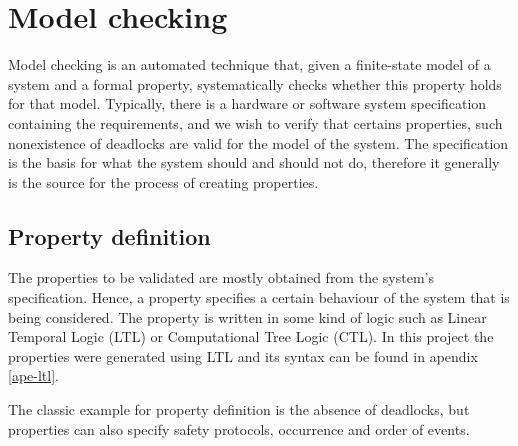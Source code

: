 \section{Model checking}
\label{sec-modelcheck}

Model checking is an automated technique that, given a finite-state model of a system and a formal property, systematically checks whether this property holds for that model\cite{Baier}. Typically, there is a hardware or software system specification containing the requirements, and we wish to verify that certains properties, such nonexistence of deadlocks are valid for the model of the system. The specification is the basis for what the system should and should not do, therefore it generally is the source for the process of creating properties.




\subsection{Property definition}

The properties to be validated are mostly obtained from the system's specification\cite{Baier}. Hence, a property specifies a certain behaviour of the system that is being considered. The property is written in some kind of logic such as Linear Temporal Logic (LTL) or Computational Tree Logic (CTL). In this project the properties were generated using LTL and its syntax can be found in apendix \ref{ape-ltl}.



The classic example for property definition is the absence of deadlocks, but properties can also specify safety protocols\cite{Merz}, occurrence and order of events.

